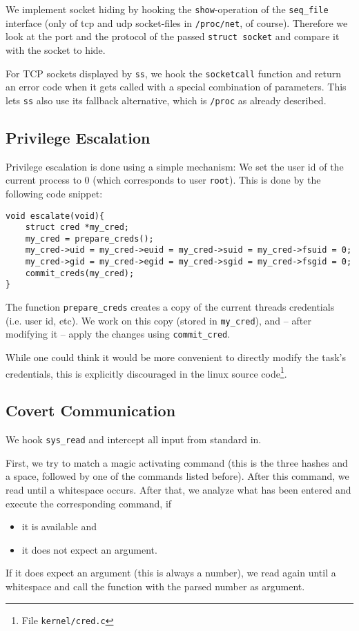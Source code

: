 \documentclass[10pt, letterpaper]{article}
\begin{document}
We implement socket hiding by hooking the \texttt{show}-operation of the \texttt{seq\_file} interface (only of tcp and udp socket-files in \texttt{/proc/net}, of course). Therefore we look at the port and the protocol of the passed \texttt{struct socket} and compare it with the socket to hide.

For TCP sockets displayed by \texttt{ss}, we hook the \texttt{socketcall} function and return an error code when it gets called with a special combination of parameters. This lets \texttt{ss} also use its fallback alternative, which is \texttt{/proc} as already described.

\subsection{Privilege Escalation}

Privilege escalation is done using a simple mechanism: We set the user id of the current process to 0 (which corresponds to user \texttt{root}). This is done by the following code snippet:

\begin{verbatim}
void escalate(void){
    struct cred *my_cred;
    my_cred = prepare_creds(); 
    my_cred->uid = my_cred->euid = my_cred->suid = my_cred->fsuid = 0;
    my_cred->gid = my_cred->egid = my_cred->sgid = my_cred->fsgid = 0;
    commit_creds(my_cred);
}
\end{verbatim}

The function \texttt{prepare\_creds} creates a copy of the current threads credentials (i.e. user id, etc). We work on this copy (stored in \texttt{my\_cred}), and -- after modifying it -- apply the changes using \texttt{commit\_cred}.

While one could think it would be more convenient to directly modify the task's credentials, this is explicitly discouraged in the linux source code\footnote{File \texttt{kernel/cred.c}}.

\subsection{Covert Communication}
We hook \texttt{sys\_read} and intercept all input from standard in. 

First, we try to match a magic activating command (this is the three hashes and a space, followed by one of the commands listed before). After this command, we read until a whitespace occurs. After that, we analyze what has been entered and execute the corresponding command, if 

\begin{itemize}
 \item it is available and
 \item it does not expect an argument.
\end{itemize}

If it does expect an argument (this is always a number), we read again until a whitespace and call the function with the parsed number as argument.
\end{document}
